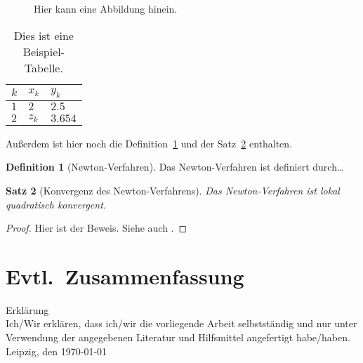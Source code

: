 \documentclass[a4paper,12pt]{article}
\newtheorem{theorem}{Satz}
\theoremstyle{definition}
\newtheorem{definition}[theorem]{Definition}
\begin{document}
\begin{figure}
    \caption{\label{f:Bezeichnung}Hier kann eine Abbildung hinein.}
\end{figure}

\begin{table}
    \begin{tabular}{l|ll}
        $k$ & $x_k$ & $y_k$\\
        \hline 
        $1$ & $2$ & $2.5$ \\
        $2$ & $z_k$ & $3.654$
    \end{tabular}
    \caption{\label{tab:Bezeichnung}Dies ist eine Beispiel-Tabelle.}
\end{table}


Au{\ss}erdem ist hier noch die Definition~\ref{def:newton} und der 
Satz~\ref{th:conv_newton} enthalten.

\begin{definition}[Newton-Verfahren]\label{def:newton}
    Das Newton-Verfahren ist definiert durch\dots
\end{definition}


\begin{theorem}[Konvergenz des Newton-Verfahrens]\label{th:conv_newton}
    Das Newton-Verfahren ist lokal quadratisch konvergent.
\end{theorem}

\begin{proof}
    Hier ist der Beweis. Siehe auch \cite[(5.3.7) Theorem]{FreundHoppe2007}.
\end{proof}


\section{Evtl.\ Zusammenfassung}



{}




\newpage 

\noindent
{\Large Erkl\"arung}\bigskip\\

\noindent
Ich/Wir erkl\"aren, dass ich/wir die vorliegende Arbeit selbstst\"andig 
und nur unter Verwendung der angegebenen Literatur und Hilfsmittel angefertigt 
habe/haben.\bigskip\\

\noindent
Leipzig, den \today 

\end{document}
